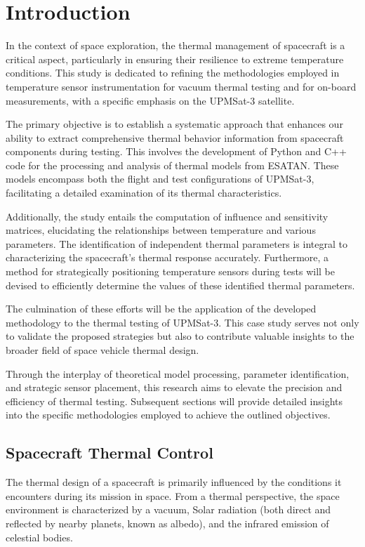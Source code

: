 \chapter{Introduction} \label{ch:chapter_01}
In the context of space exploration, the thermal management of spacecraft is a critical aspect, particularly in ensuring their resilience to extreme temperature conditions. This study is dedicated to refining the methodologies employed in temperature sensor instrumentation for vacuum thermal testing and for on-board measurements, with a specific emphasis on the UPMSat-3 satellite.

The primary objective is to establish a systematic approach that enhances our ability to extract comprehensive thermal behavior information from spacecraft components during testing. This involves the development of Python and C++ code for the processing and analysis of thermal models from ESATAN. These models encompass both the flight and test configurations of UPMSat-3, facilitating a detailed examination of its thermal characteristics.

Additionally, the study entails the computation of influence and sensitivity matrices, elucidating the relationships between temperature and various parameters. The identification of independent thermal parameters is integral to characterizing the spacecraft's thermal response accurately. Furthermore, a method for strategically positioning temperature sensors during tests will be devised to efficiently determine the values of these identified thermal parameters.

The culmination of these efforts will be the application of the developed methodology to the thermal testing of UPMSat-3. This case study serves not only to validate the proposed strategies but also to contribute valuable insights to the broader field of space vehicle thermal design.

Through the interplay of theoretical model processing, parameter identification, and strategic sensor placement, this research aims to elevate the precision and efficiency of thermal testing. Subsequent sections will provide detailed insights into the specific methodologies employed to achieve the outlined objectives.

\section{Spacecraft Thermal Control}

The thermal design of a spacecraft is primarily influenced by the conditions it encounters during its mission in space. From a thermal perspective, the space environment is characterized by a vacuum, Solar radiation (both direct and reflected by nearby planets, known as albedo), and the infrared emission of celestial bodies.

